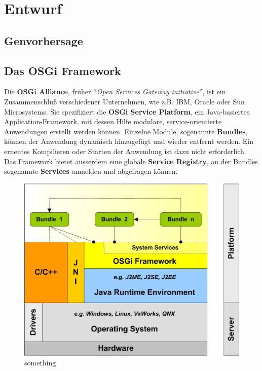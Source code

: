 \chapter{Entwurf}
\section{Genvorhersage}
\section{Das OSGi Framework}
Die \textbf{OSGi Alliance}, früher
\enquote{\textit{Open Services Gateway initiative}}, ist ein Zusammenschluß
verschiedener Unternehmen, wie z.B. IBM, Oracle oder Sun Microsystems.
Sie spezifiziert die \textbf{OSGi Service Platform}, ein Java-basiertes
Application-Framework, mit dessen Hilfe modulare, service-orientierte
Anwendungen erstellt werden können. Einzelne Module, sogenannte
\textbf{Bundles}, können der Anwendung dynamisch hinzugefügt und wieder
entfernt werden. Ein erneutes Kompilieren oder Starten der Anwendung ist dazu
nicht erforderlich.
Das Framework bietet ausserdem eine globale \textbf{Service Registry}, an der
Bundles sogenannte \textbf{Services} anmelden und abgefragen können.
\begin{figure}[ht]
	\begin{center}
		\includegraphics[scale=2]{pics/osgi_layer.png}
	\caption{something}
	\end{center}
	\label{fig:perfect}
\end{figure}
